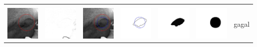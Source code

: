 \begin{table}[H]
\begin{tabular}{|m{0.7in}|m{0.7in}|m{0.7in}|m{0.7in}|m{0.7in}|m{0.7in}|m{0.7in}|}
		&  &  & & & &  \\
		\includegraphics[width=0.7in]{dataset/dataset_3/luka_merah/ready/25_integer_init.jpg}&
		\includegraphics[width=0.7in]{dataset/dataset_3/luka_merah/ready/25_integer_ext.jpg}&
		\includegraphics[width=0.7in]{dataset/dataset_3/luka_merah/ready/25_integer_result.jpg}&
		\includegraphics[width=0.7in]{dataset/dataset_3/luka_merah/ready/25_gt_r_integer.jpg}&
		\includegraphics[width=0.7in]{dataset/dataset_3/luka_merah/ready/25_r.jpg}&
		\includegraphics[width=0.7in]{dataset/dataset_3/luka_merah/ready/25_integer_r.jpg}&
		gagal\\
		\hline
		
	\end{tabular}
\end{table}


